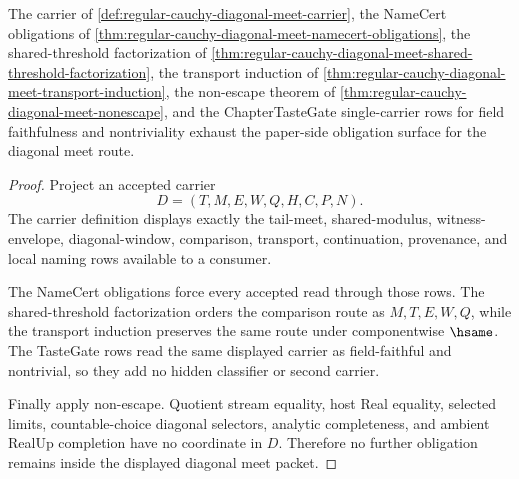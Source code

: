\begin{theorem}
\label{thm:regular-cauchy-diagonal-meet-obligation-closure}
The carrier of \autoref{def:regular-cauchy-diagonal-meet-carrier}, the NameCert obligations of \autoref{thm:regular-cauchy-diagonal-meet-namecert-obligations}, the shared-threshold factorization of \autoref{thm:regular-cauchy-diagonal-meet-shared-threshold-factorization}, the transport induction of \autoref{thm:regular-cauchy-diagonal-meet-transport-induction}, the non-escape theorem of \autoref{thm:regular-cauchy-diagonal-meet-nonescape}, and the ChapterTasteGate single-carrier rows for field faithfulness and nontriviality exhaust the paper-side obligation surface for the diagonal meet route.
\end{theorem}
\begin{proof}
Project an accepted carrier
$$
D=(T,M,E,W,Q,H,C,P,N).
$$
The carrier definition displays exactly the tail-meet, shared-modulus, witness-envelope, diagonal-window, comparison, transport, continuation, provenance, and local naming rows available to a consumer.

The NameCert obligations force every accepted read through those rows. The shared-threshold factorization orders the comparison route as $M,T,E,W,Q$, while the transport induction preserves the same route under componentwise $\hsame$. The TasteGate rows read the same displayed carrier as field-faithful and nontrivial, so they add no hidden classifier or second carrier.

Finally apply non-escape. Quotient stream equality, host Real equality, selected limits, countable-choice diagonal selectors, analytic completeness, and ambient RealUp completion have no coordinate in $D$. Therefore no further obligation remains inside the displayed diagonal meet packet.
\end{proof}


